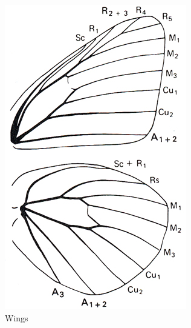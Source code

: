\documentclass[letterpaper, 11pt]{article}
\begin{document}
\begin{figure}[ht!]
    \centering
    \begin{subfigure}[ht!]{0.25\textwidth}
        \includegraphics[width=\textwidth]{image10}
        \caption{Wings}
        \label{fig:pierid1}
    \end{subfigure}
    \qquad %
    \begin{subfigure}[ht!]{0.5\textwidth}

\end{subfigure}
\end{figure}
\end{document}

